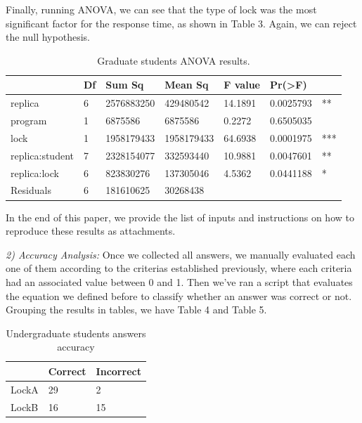 Finally, running ANOVA, we can see that the type of lock was the most significant factor for the response time, as shown in Table 3. Again, we can reject the null hypothesis.

\begin{table}
\begin{center}
\caption{Graduate students ANOVA results.}
\begin{tabular}{|l|l|l|l|l|ll|}
\hline
                 & Df &    Sum Sq &   Mean Sq  & F value &   Pr(>F) & \\   
\hline
replica          & 6 & 2576883250 &  429480542 & 14.1891 & 0.0025793 & **  \\
program          & 1 &    6875586 &    6875586 &  0.2272 & 0.6505035 &     \\
lock             & 1 & 1958179433 & 1958179433 & 64.6938 & 0.0001975 & *** \\
replica:student  & 7 & 2328154077 &  332593440 & 10.9881 & 0.0047601 & **  \\
replica:lock     & 6 &  823830276 &  137305046 &  4.5362 & 0.0441188 & *   \\
Residuals        & 6 &  181610625 &   30268438 &         &           &     \\
\hline
\end{tabular}
\end{center}
\end{table}

In the end of this paper, we provide the list of inputs and instructions on how to reproduce these results as attachments.

\emph{2) Accuracy Analysis:} Once we collected all answers, we manually evaluated each one of them according to the criterias established previously, where each criteria had an associated value between 0 and 1. Then we've ran a script that evaluates the equation we defined before to classify whether an answer was correct or not. Grouping the results in tables, we have Table 4 and Table 5.

\begin{table}
\begin{center}
\caption{Undergraduate students answers accuracy}
\begin{tabular}{|l|l|l|}
\hline
 & Correct & Incorrect\\
\hline
LockA & 29 & 2\\
LockB & 16 & 15\\
\hline
\end{tabular}
\end{center}
\end{table}


